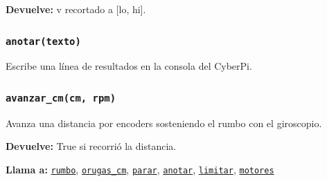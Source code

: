 \par{}\par\smallskip
\noindent\textbf{Devuelve:} v recortado a [lo, hi].\par

\subsubsection{\texttt{anotar(texto)}}\label{fn:calibrations:anotar}
\noindent Escribe una línea de resultados en la consola del CyberPi.

\par{}\par\smallskip

\subsubsection{\texttt{avanzar\_\allowbreak{}cm(cm, rpm)}}\label{fn:calibrations:avanzar-cm}
\noindent Avanza una distancia por encoders sosteniendo el rumbo con el giroscopio.

\par{}\par\smallskip
\noindent\textbf{Devuelve:} True si recorrió la distancia.\par
\noindent\textbf{Llama a:} \hyperref[fn:calibrations:rumbo]{\texttt{rumbo}}, \hyperref[fn:calibrations:orugas-cm]{\texttt{orugas\_\allowbreak{}cm}}, \hyperref[fn:calibrations:parar]{\texttt{parar}}, \hyperref[fn:calibrations:anotar]{\texttt{anotar}}, \hyperref[fn:calibrations:limitar]{\texttt{limitar}}, \hyperref[fn:calibrations:motores]{\texttt{motores}}\par

